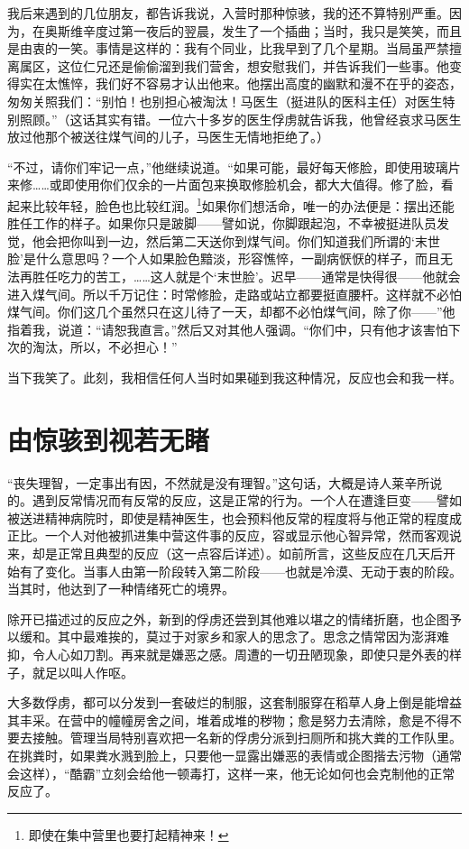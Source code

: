 \documentclass[11pt,oneside]{book}
\begin{document}
\begin{common-format}
我后来遇到的几位朋友，都告诉我说，入营时那种惊骇，我的还不算特别严重。因为，在奥斯维辛度过第一夜后的翌晨，发生了一个插曲；当时，我只是笑笑，而且是由衷的一笑。事情是这样的：我有个同业，比我早到了几个星期。当局虽严禁擅离属区，这位仁兄还是偷偷溜到我们营舍，想安慰我们，并告诉我们一些事。他变得实在太憔悴，我们好不容易才认出他来。他摆出高度的幽默和漫不在乎的姿态，匆匆关照我们：“别怕！也别担心被淘汰！马医生（挺进队的医科主任）对医生特别照顾。”（这话其实有错。一位六十多岁的医生俘虏就告诉我，他曾经哀求马医生放过他那个被送往煤气间的儿子，马医生无情地拒绝了。）

“不过，请你们牢记一点，”他继续说道。“如果可能，最好每天修脸，即使用玻璃片来修……或即使用你们仅余的一片面包来换取修脸机会，都大大值得。修了脸，看起来比较年轻，脸色也比较红润。\footnote{即使在集中营里也要打起精神来！}如果你们想活命，唯一的办法便是：摆出还能胜任工作的样子。如果你只是跛脚——譬如说，你脚跟起泡，不幸被挺进队员发觉，他会把你叫到一边，然后第二天送你到煤气间。你们知道我们所谓的‘末世脸’是什么意思吗？一个人如果脸色黯淡，形容憔悴，一副病恹恹的样子，而且无法再胜任吃力的苦工，……这人就是个‘末世脸’。迟早——通常是快得很——他就会进入煤气间。所以千万记住：时常修脸，走路或站立都要挺直腰杆。这样就不必怕煤气间。你们这几个虽然只在这儿待了一天，却都不必怕煤气间，除了你——”他指着我，说道：“请恕我直言。”然后又对其他人强调。“你们中，只有他才该害怕下次的淘汰，所以，不必担心！”

当下我笑了。此刻，我相信任何人当时如果碰到我这种情况，反应也会和我一样。

\section{由惊骇到视若无睹}
“丧失理智，一定事出有因，不然就是没有理智。”这句话，大概是诗人莱辛所说的。遇到反常情况而有反常的反应，这是正常的行为。一个人在遭逢巨变——譬如被送进精神病院时，即使是精神医生，也会预料他反常的程度将与他正常的程度成正比。一个人对他被抓进集中营这件事的反应，容或显示他心智异常，然而客观说来，却是正常且典型的反应（这一点容后详述）。如前所言，这些反应在几天后开始有了变化。当事人由第一阶段转入第二阶段——也就是冷漠、无动于衷的阶段。当其时，他达到了一种情绪死亡的境界。

除开已描述过的反应之外，新到的俘虏还尝到其他难以堪之的情绪折磨，也企图予以缓和。其中最难挨的，莫过于对家乡和家人的思念了。思念之情常因为澎湃难抑，令人心如刀割。再来就是嫌恶之感。周遭的一切丑陋现象，即使只是外表的样子，就足以叫人作呕。

大多数俘虏，都可以分发到一套破烂的制服，这套制服穿在稻草人身上倒是能增益其丰采。在营中的幢幢房舍之间，堆着成堆的秽物；愈是努力去清除，愈是不得不要去接触。管理当局特别喜欢把一名新的俘虏分派到扫厕所和挑大粪的工作队里。在挑粪时，如果粪水溅到脸上，只要他一显露出嫌恶的表情或企图揩去污物（通常会这样），“酷霸”立刻会给他一顿毒打，这样一来，他无论如何也会克制他的正常反应了。


\end{common-format}
\end{document}
